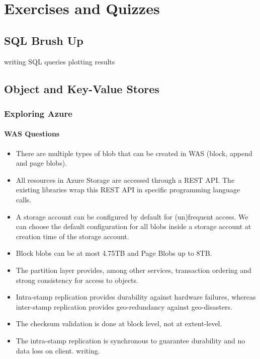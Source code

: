 \section{Exercises and Quizzes}

\subsection{SQL Brush Up}

writing SQL queries
plotting results



\subsection{Object and Key-Value Stores}

\subsubsection{Exploring Azure}


\paragraph{WAS Questions}
\begin{itemize}
    \item There are multiple types of blob that can be created in WAS (block, append and page blobs).
    \item All resources in Azure Storage are accessed through a REST API. The existing libraries wrap this REST API in specific programming language calls.
    \item A storage account can be configured by default for (un)frequent access. We can choose the default configuration for all blobs inside a storage account at creation time of the storage account.
    \item Block blobs can be at most 4.75TB and Page Blobs up to 8TB.
    \item The partition layer provides, among other services, transaction ordering and strong consistency for access to objects.
    \item Intra-stamp replication provides durability against hardware failures, whereas inter-stamp replication provides geo-redundancy against geo-disasters.
    \item The checksum validation is done at block level, not at extent-level. %
    \item The intra-stamp replication is synchronous to guarantee durability and no data loss on client. writing.
\end{itemize}

